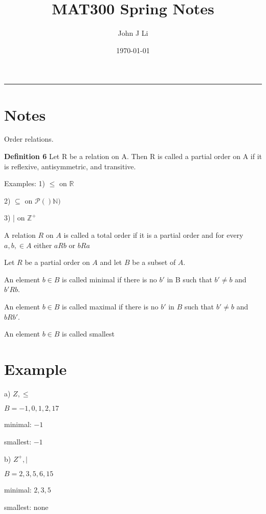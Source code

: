 \documentclass{article}
\title{MAT300 Spring Notes}
\date{\today}
\author{John J Li}
\begin{document}
    \maketitle
    \thispagestyle{empty}
    \noindent\rule{\textwidth}{0.8pt}

    \section*{Notes}

    Order relations.

    \textbf{Definition 6} Let R be a relation on A. Then R is called a partial order on A if 
    it is reflexive, antisymmetric, and transitive.

    Examples: 1) $\leq$ on $\mathbb{R}$

    2) $\subseteq$ on $\mathcal{P}()\mathbb{N})$

    3) | on $\mathbb{Z}^+$

    A relation $R$ on $A$ is called a total order if it is a partial order and for every
    $a,b,\in A$ either $aRb$ or $bRa$
    
    Let $R$ be a partial order on $A$ and let $B$ be a subset of $A$.

    An element $b\in B$ is called minimal if there is no $b'$ in B such that $b'\neq b$
    and $b'Rb$.

    An element $b\in B$ is called maximal if there is no $b'$ in $B$ such that $b'\neq b$
    and $bRb'$.

    An element $b\in B$ is called smallest 



  



    \section*{Example}

    a) $Z,\leq$

    $B = {-1,0,1,2,17}$

    minimal: $-1$

    smallest: $-1$
   
    b) $Z^+, |$

    $B = {2,3,5,6,15}$

    minimal: $2,3,5$

    smallest: none
\end{document}
